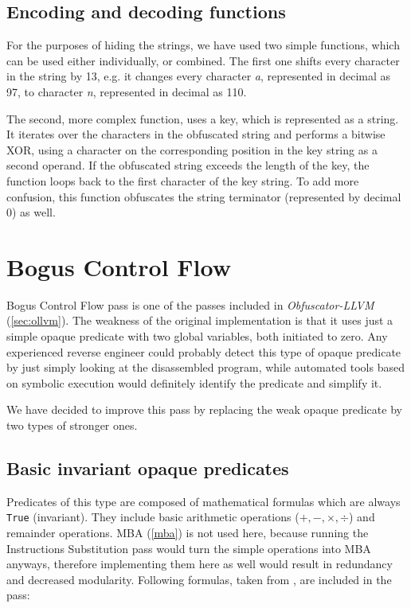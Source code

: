 \documentclass[
  digital, %
  notable,   %
  twoside, %
  nolof,     %
  nolot,     %
]{fithesis3}
\theoremstyle{definition}
\begin{document}
\subsection{Encoding and decoding functions}
For the purposes of hiding the strings, we have used two simple functions, which can be used either individually, or combined. The first one shifts every character in the string by 13, e.g. it changes every character \textit{a}, represented in decimal as 97, to character \textit{n}, represented in decimal as 110.

The second, more complex function, uses a key, which is represented as a string. It iterates over the characters in the obfuscated string and performs a bitwise XOR, using a character on the corresponding position in the key string as a second operand. If the obfuscated string exceeds the length of the key, the function loops back to the first character of the key string. To add more confusion, this function obfuscates the string terminator (represented by decimal 0) as well.

\section{Bogus Control Flow} \label{des_bogus}

Bogus Control Flow pass is one of the passes included in \textit{Obfuscator-LLVM} (\ref{sec:ollvm}). The weakness of the original implementation is that it uses just a simple opaque predicate with two global variables, both initiated to zero. Any experienced reverse engineer could probably detect this type of opaque predicate by just simply looking at the disassembled program, while automated tools based on symbolic execution would definitely identify the predicate and simplify it. 

We have decided to improve this pass by replacing the weak opaque predicate by two types of stronger ones.

\subsection{Basic invariant opaque predicates}
Predicates of this type are composed of mathematical formulas which are always \texttt{True} (invariant). They include basic arithmetic operations ($+, -, \times, \div$) and remainder operations. MBA (\ref{mba}) is not used here, because running the Instructions Substitution pass would turn the simple operations into MBA anyways, therefore implementing them here as well would result in redundancy and decreased modularity. Following formulas, taken from \cite{loop}, are included in the pass:
\end{document}
